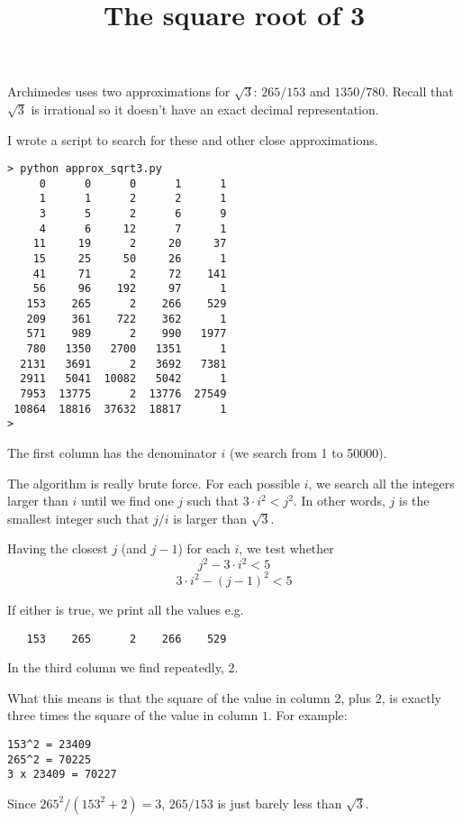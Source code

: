 \documentclass[11pt, oneside]{article}
\title{The square root of 3}
\date{}
\begin{document}
\maketitle
\Large


Archimedes uses two approximations for $\sqrt{3}$:  $265/153$  and $1350/780$. Recall that $\sqrt{3}$ is irrational so it doesn't have an exact decimal representation. 

I wrote a script to search for these and other close approximations.

\begin{verbatim}
> python approx_sqrt3.py 
     0      0      0      1      1
     1      1      2      2      1
     3      5      2      6      9
     4      6     12      7      1
    11     19      2     20     37
    15     25     50     26      1
    41     71      2     72    141
    56     96    192     97      1
   153    265      2    266    529
   209    361    722    362      1
   571    989      2    990   1977
   780   1350   2700   1351      1
  2131   3691      2   3692   7381
  2911   5041  10082   5042      1
  7953  13775      2  13776  27549
 10864  18816  37632  18817      1
> 
\end{verbatim}
The first column has the denominator $i$ (we search from 1 to 50000).  

The algorithm is really brute force.  For each possible $i$, we search all the integers larger than $i$ until we find one $j$ such that $3 \cdot i^2 < j^2$.  In other words, $j$ is the smallest integer such that $j/i$ is larger than $\sqrt{3}$.  

Having the closest $j$ (and $j-1$) for each $i$, we test whether
\[ j^2 - 3 \cdot i^2 < 5 \]
\[ 3 \cdot i^2 - (j-1)^2 < 5 \]

If either is true, we print all the values e.g.
\begin{verbatim}
   153    265      2    266    529
\end{verbatim}

In the third column we find repeatedly, 2.  

What this means is that the square of the value in column 2, plus $2$, is exactly three times the square of the value in column $1$.  For example:

\begin{verbatim}
153^2 = 23409
265^2 = 70225
3 x 23409 = 70227
\end{verbatim}
Since $265^2 / (153^2 + 2) = 3$,  $265/153$ is just barely less than $\sqrt{3}$.
\end{document}
